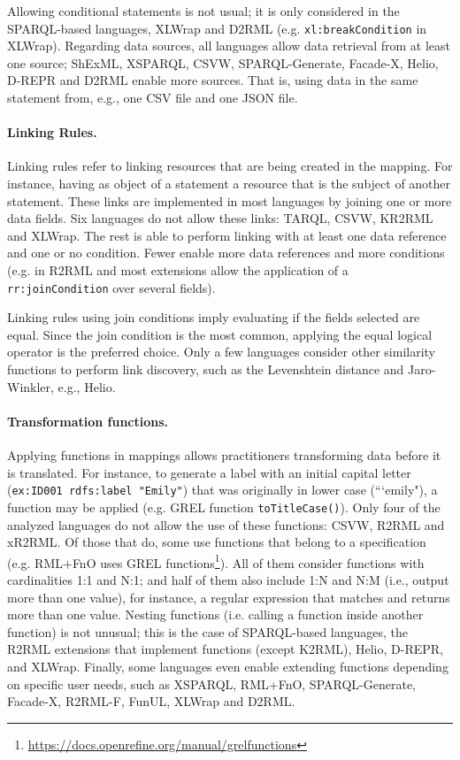 Allowing conditional statements is not usual; it is only considered in the SPARQL-based languages, XLWrap and D2RML (e.g. \texttt{xl:breakCo\-ndition} in XLWrap). Regarding data sources, all languages allow data retrieval from at least one source; ShExML, XSPARQL, CSVW, SPARQL-Generate, Facade-X, Helio, D-REPR and D2RML enable more sources. That is, using data in the same statement from, e.g., one CSV file and one JSON file.


\noindent\paragraph{\textbf{Linking Rules.}} Linking rules refer to linking resources that are being created in the mapping. For instance, having as object of a statement a resource that is the subject of another statement. These links are implemented in most languages by joining one or more data fields. Six languages do not allow these links: TARQL, CSVW, KR2RML and XLWrap. The rest is able to perform linking with at least one data reference and one or no condition. Fewer enable more data references and more conditions (e.g. in R2RML and most extensions allow the application of a \texttt{rr:joinCondition} over several fields). 

Linking rules using join conditions imply evaluating if the fields selected are equal. Since the join condition is the most common, applying the equal logical operator is the preferred choice. Only a few languages consider other similarity functions to perform link discovery, such as the Levenshtein distance and Jaro-Winkler, e.g., Helio. %




\noindent\paragraph{\textbf{Transformation functions.}} Applying functions in mappings allows practitioners transforming data before it is translated. For instance, to generate a label with an initial capital letter (\texttt{ex:ID001 rdfs:label "Emily"}) that was originally in lower case (```emily"), a function may be applied (e.g. GREL function \texttt{toTi\-tleCase()}). Only four of the analyzed languages do not allow the use of these functions: CSVW, R2RML and xR2RML. Of those that do, some use functions that belong to a specification (e.g. RML+FnO uses GREL functions\footnote{\url{https://docs.openrefine.org/manual/grelfunctions}}). All of them consider functions with cardinalities 1:1 and N:1; and half of them also include 1:N and N:M (i.e., output more than one value), for instance, a regular expression that matches and returns more than one value.  Nesting functions (i.e. calling a function inside another function) is not unusual; this is the case of SPARQL-based languages, the R2RML extensions that implement functions (except K2RML), Helio, D-REPR, and XLWrap. Finally, some languages even enable extending functions depending on specific user needs, such as XSPARQL, RML+FnO, SPARQL-Generate, Facade-X, R2RML-F, FunUL, XLWrap and D2RML.


